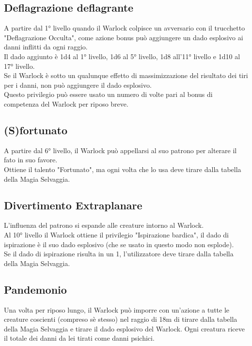 \subsection{Deflagrazione deflagrante}

A partire dal 1° livello quando il Warlock colpisce un avversario con il trucchetto "Deflagrazione Occulta", come azione bonus può aggiungere un dado esplosivo ai danni inflitti da ogni raggio. \\ Il dado aggiunto è 1d4 al 1° livello, 1d6 al 5° livello, 1d8 all'11° livello e 1d10 al 17° livello. \\ Se il Warlock è sotto un qualunque effetto di massimizzazione del risultato dei tiri per i danni, non può aggiungere il dado esplosivo. \\ Questo privilegio può essere usato un numero di volte pari al bonus di competenza del Warlock per riposo breve.

\subsection{(S)fortunato}

A partire dal 6° livello, il Warlock può appellarsi al suo patrono per alterare il fato in suo favore. \\ Ottiene il talento "Fortunato", ma ogni volta che lo usa deve tirare dalla tabella della Magia Selvaggia.

\subsection{Divertimento Extraplanare}

L'influenza del patrono si espande alle creature intorno al Warlock. \\ Al 10° livello il Warlock ottiene il privilegio "Ispirazione bardica", il dado di ispirazione è il suo dado esplosivo (che se usato in questo modo non esplode). \\ Se il dado di ispirazione risulta in un 1, l'utilizzatore deve tirare dalla tabella della Magia Selvaggia.

\subsection{Pandemonio}

Una volta per riposo lungo, il Warlock può imporre con un'azione a tutte le creature coscienti (compreso sè stesso) nel raggio di 18m di tirare dalla tabella della Magia Selvaggia e tirare il dado esplosivo del Warlock. Ogni creatura riceve il totale dei danni da lei tirati come danni psichici.

